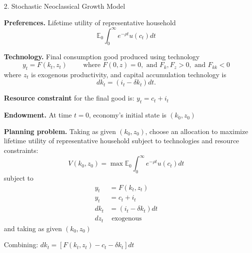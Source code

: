 \documentclass[11pt, aspectratio=169]{beamer}
\begin{document}
\begin{frame}{2. Stochastic Neoclassical Growth Model}

\textbf{Preferences.} Lifetime utility of representative household 
\begin{equation*}
	\mathbb E_0 \int_0^\infty e^{- \rho t} u(c_t) dt 
\end{equation*}


\vspace{3mm}
\textbf{Technology.} Final consumption good produced using technology 
\begin{equation*}
	y_t = F(k_t, z_t)
	\quad\quad \text{ where } 
	F(0, z) = 0, \text{ and } F_k, F_z > 0, \text{ and } F_{kk} < 0
\end{equation*}
where $z_t$ is exogenous productivity, and capital accumulation technology is 
\begin{equation*}
	dk_t = (i_t - \delta k_t) dt.
\end{equation*}


\vspace{3mm}
\textbf{Resource constraint} for the final good is:  $y_t = c_t + i_t$ 

\vspace{3mm}
\textbf{Endowment.} At time $t = 0$, economy's initial state is $(k_0, z_0)$

\end{frame}


\begin{frame}{}

\textbf{Planning problem.} Taking as given $(k_0, z_0)$, choose an allocation to maximize lifetime utility of representative household subject to technologies and resource constraints:
\begin{equation*}
	V(k_0, z_0) = \max \mathbb E_0 \int_0^\infty e^{- \rho t} u(c_t) dt 
\end{equation*}
subject to 
\begin{align*}
	y_t &= F(k_t, z_t) \\
	y_t &= c_t + i_t \\
	dk_t &= (i_t - \delta k_t) dt \\
	dz_t &\text{ exogenous }
\end{align*}
and taking as given $(k_0, z_0)$

\vspace{2mm}
Combining: \hspace{30mm} $dk_t = [F(k_t, z_t) - c_t - \delta k_t] dt$

\end{frame}
\end{document}
